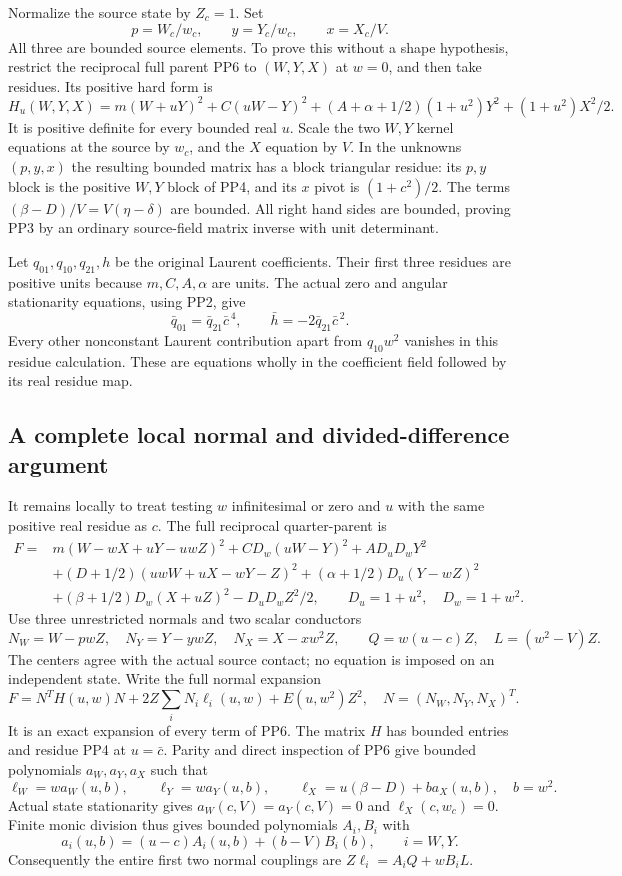 Normalize the source state by $Z_c=1$. Set
\[
 p=W_c/w_c,\qquad y=Y_c/w_c,\qquad x=X_c/V.
 \tag{PP3}
\]
All three are bounded source elements. To prove this without a
shape hypothesis, restrict the reciprocal full parent PP6 to
$(W,Y,X)$ at $w=0$, and then take residues. Its positive hard form is
\[
 H_u(W,Y,X)=m(W+uY)^2+C(uW-Y)^2
       +(A+\alpha+1/2)(1+u^2)Y^2+(1+u^2)X^2/2.
 \tag{PP4}
\]
It is positive definite for every bounded real $u$. Scale the two
$W,Y$ kernel equations at the source by $w_c$, and the $X$
equation by $V$. In the unknowns $(p,y,x)$ the resulting bounded
matrix has a block triangular residue: its $p,y$ block is the
positive $W,Y$ block of PP4, and its $x$ pivot is $(1+c^2)/2$.
The terms $(\beta-D)/V=V(\eta-\delta)$ are bounded. All right
hand sides are bounded, proving PP3 by an ordinary source-field
matrix inverse with unit determinant.

Let $q_{01},q_{10},q_{21},h$ be the original Laurent coefficients.
Their first three residues are positive units because $m,C,A,\alpha$
are units. The actual zero and angular stationarity equations,
using PP2, give
\[
 \bar q_{01}=\bar q_{21}\bar c^{\,4},\qquad
 \bar h=-2\bar q_{21}\bar c^{\,2}.
 \tag{PP5}
\]
Every other nonconstant Laurent contribution apart from $q_{10}w^2$
vanishes in this residue calculation. These are equations wholly in
the coefficient field followed by its real residue map.

\subsection{A complete local normal and divided-difference argument}

It remains locally to treat testing $w$ infinitesimal or zero and
$u$ with the same positive real residue as $c$. The full reciprocal
quarter-parent is
\[
\begin{split}
 F={}&m(W-wX+uY-uwZ)^2+CD_w(uW-Y)^2+AD_uD_wY^2\\
 &+(D+1/2)(uwW+uX-wY-Z)^2
       +(\alpha+1/2)D_u(Y-wZ)^2\\
 &+(\beta+1/2)D_w(X+uZ)^2-D_uD_wZ^2/2,
 \qquad D_u=1+u^2,\quad D_w=1+w^2.
\end{split}\tag{PP6}
\]
Use three unrestricted normals and two scalar conductors
\[
 N_W=W-pwZ,\quad N_Y=Y-ywZ,\quad N_X=X-xw^2Z,
 \qquad Q=w(u-c)Z,\quad L=(w^2-V)Z.
 \tag{PP7}
\]
The centers agree with the actual source contact; no equation is
imposed on an independent state. Write the full normal expansion
\[
 F=N^TH(u,w)N+2Z\sum_iN_i\ell_i(u,w)+E(u,w^2)Z^2,
 \quad N=(N_W,N_Y,N_X)^T.
 \tag{PP8}
\]
It is an exact expansion of every term of PP6. The matrix $H$ has
bounded entries and residue PP4 at $u=\bar c$. Parity and direct
inspection of PP6 give bounded polynomials $a_W,a_Y,a_X$ such that
\[
 \ell_W=w a_W(u,b),\qquad \ell_Y=w a_Y(u,b),\qquad
 \ell_X=u(\beta-D)+b a_X(u,b),\quad b=w^2.
 \tag{PP9}
\]
Actual state stationarity gives $a_W(c,V)=a_Y(c,V)=0$ and
$\ell_X(c,w_c)=0$. Finite monic division thus gives bounded
polynomials $A_i,B_i$ with
\[
 a_i(u,b)=(u-c)A_i(u,b)+(b-V)B_i(b),\qquad i=W,Y.
\]
Consequently the entire first two normal couplings are
$Z\ell_i=A_iQ+wB_iL$.

